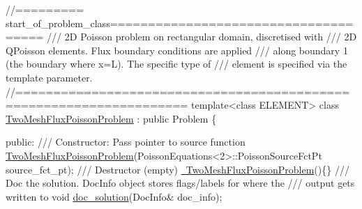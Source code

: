  
\begin{DoxyCodeInclude}
\textcolor{comment}{//========= start\_of\_problem\_class=====================================}
\textcolor{comment}{/// 2D Poisson problem on rectangular domain, discretised with}
\textcolor{comment}{}\textcolor{comment}{/// 2D QPoisson elements. Flux boundary conditions are applied}
\textcolor{comment}{}\textcolor{comment}{/// along boundary 1 (the boundary where x=L). The specific type of }
\textcolor{comment}{}\textcolor{comment}{/// element is specified via the template parameter.}
\textcolor{comment}{}\textcolor{comment}{//====================================================================}
\textcolor{keyword}{template}<\textcolor{keyword}{class} ELEMENT> 
\textcolor{keyword}{class }\hyperlink{classTwoMeshFluxPoissonProblem}{TwoMeshFluxPoissonProblem} : \textcolor{keyword}{public} Problem
\{

\textcolor{keyword}{public}:
\textcolor{comment}{}
\textcolor{comment}{ /// Constructor: Pass pointer to source function}
\textcolor{comment}{} \hyperlink{classTwoMeshFluxPoissonProblem_ace5a47aa61da5fd2a8761a16ffb3711c}{TwoMeshFluxPoissonProblem}(PoissonEquations<2>::PoissonSourceFctPt source\_fct\_pt);
\textcolor{comment}{}
\textcolor{comment}{ /// Destructor (empty)}
\textcolor{comment}{} \hyperlink{classTwoMeshFluxPoissonProblem_a03e83ef12db3bf5a1e015c3c3b11337c}{~TwoMeshFluxPoissonProblem}()\{\}
\textcolor{comment}{}
\textcolor{comment}{ /// Doc the solution. DocInfo object stores flags/labels for where the}
\textcolor{comment}{ /// output gets written to}
\textcolor{comment}{} \textcolor{keywordtype}{void} \hyperlink{classTwoMeshFluxPoissonProblem_a6320ad6d71f24a2d7e03a7bb7e691b31}{doc\_solution}(DocInfo& doc\_info);



\end{DoxyCodeInclude}

